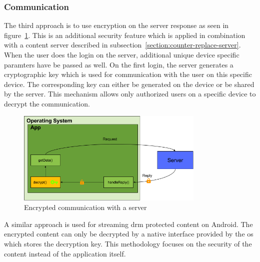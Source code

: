 \subsubsection{Communication} \label{section:counter-replace-encryption-content-communication}
The third approach is to use encryption on the server response as seen in figure~\ref{fig:encryptionComm}.
This is an additional security feature which is applied in combination with a content server described in subsection~\ref{section:counter-replace-server}.
When the user does the login on the server, additional unique device specific paramters have be passed as well.
On the first login, the server generates a cryptographic key which is used for communication with the user on this specific device.
The corresponding key can either be generated on the device or be shared by the server.
This mechanism allows only authorized users on a specific device to decrypt the communication.
\newline
\begin{figure}[h]
    \centering
    \includegraphics[width=0.8\textwidth]{data/encryptionComm.png}
    \caption{Encrypted communication with a server}
    \label{fig:encryptionComm}
\end{figure}

A similar approach is used for streaming \gls{drm} protected content on Android.
The encrypted content can only be decrypted by a native interface provided by the \gls{os} which stores the decryption key. \cite{androidDrm}
\newline
This methodology focuses on the security of the content instead of the application itself.
